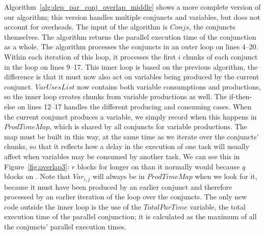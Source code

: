 Algorithm~\ref{alg:dep_par_conj_overlap_middle} shows a more complete
version of our algorithm;
this version handles multiple conjuncts and variables,
but does not account for overheads.
The input of the algorithm is $Conjs$,
the conjuncts themselves.
The algorithm returns the parallel execution time of the conjunction as a
whole.
The algorithm processes the conjuncts in an outer loop on lines 4--20.
Within each iteration of this loop,
it processes the first $i$ chunks of each conjunct in the loop on lines 9--17.
This inner loop is based on the previous algorithm,
the difference is that it must now also act on variables being produced by
the current conjunct.
$VarUsesList$ now contains both variable consumptions and productions,
so the inner loop creates chunks from variable productions as well.
The if-then-else on lines 12--17 handles the different producing and consuming
cases.
When the current conjunct
produces a variable, we simply record when this happens in $ProdTimeMap$,
which is shared by all conjuncts for variable productions.
The map must be built in this way, at the same time as we iterate over the
conjuncts' chunks,
so that it reflects how a delay in the execution of one task will usually
affect when variables may be consumed by another task.
We can see this in Figure~\ref{fig:overlap3}:
$r$ blocks for longer on  than it normally would because $q$ blocks
on .
Note that $Var_{i, j}$
will always be in $ProdTimeMap$ when we look for it,
because it must have been produced by an earlier conjunct
and therefore processed by an earlier iteration of the loop over the
conjuncts.
The only new code outside the inner loop is the use of the $TotalParTime$
variable,
the total execution time of the parallel conjunction;
it is calculated as the maximum of all the conjuncts' parallel execution
times.

%
%

